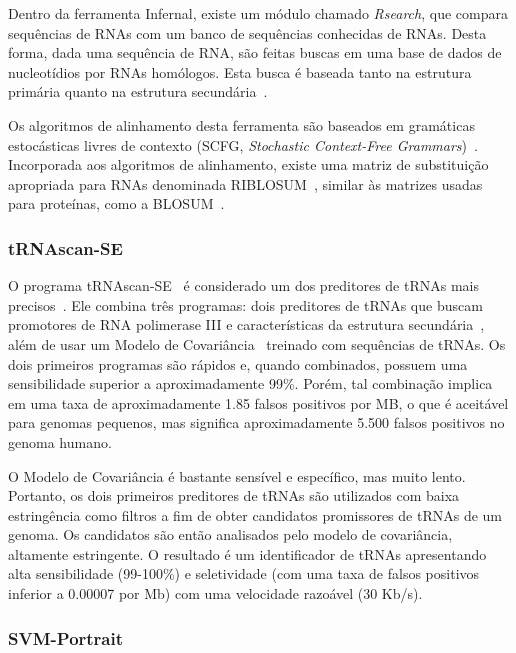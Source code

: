 Dentro da ferramenta Infernal, existe um módulo chamado \textit{Rsearch}, que compara
sequências de RNAs com um banco de sequências conhecidas de RNAs. Desta
forma, dada uma sequência de RNA, são feitas buscas em uma base de dados de
nucleotídios por RNAs homólogos. Esta busca é baseada tanto na estrutura primária quanto na estrutura secundária~\citep{klein2003rsearch:2003}.

Os algoritmos de alinhamento desta ferramenta são baseados em gramáticas estocásticas livres de contexto (SCFG, \textit{Stochastic Context-Free Grammars})~\citep{eddy1994rna:1994,sakakibara1994stochastic:1994}. Incorporada aos algoritmos de alinhamento, existe uma matriz de substituição apropriada para RNAs denominada RIBLOSUM~\citep{klein2003rsearch:2003}, similar às matrizes usadas para proteínas, como a BLOSUM~\citep{henikoff1992amino:1992}.


\subsubsection*{tRNAscan-SE}

O programa tRNAscan-SE~\citep{lowe1997trnascan:1997} é considerado um dos preditores de tRNAs mais precisos~\citep{laslett2004aragorn:2004}. Ele combina três programas: dois preditores de tRNAs que buscam promotores de RNA polimerase III e características da estrutura secundária~\citep{fichant1991identifying:1991,pavesi1994identification:1994}, além de usar um Modelo de Covariância~\citep{eddy1994rna:1994} treinado com sequências de tRNAs. Os dois primeiros programas são rápidos e, quando combinados, possuem uma sensibilidade superior a aproximadamente 99\%. Porém, tal combinação implica em uma taxa de aproximadamente 1.85 falsos positivos por MB, o que é aceitável para genomas pequenos, mas significa aproximadamente 5.500 falsos positivos no genoma humano.

O Modelo de Covariância é bastante sensível e específico, mas muito lento. Portanto, os dois primeiros preditores de tRNAs são utilizados com baixa estringência como filtros a fim de obter candidatos promissores de tRNAs de um genoma. Os candidatos são então analisados pelo modelo de covariância, altamente estringente. O resultado é um identificador de tRNAs apresentando alta sensibilidade (99-100\%) e seletividade (com uma taxa de falsos positivos inferior a 0.00007 por Mb) com uma velocidade razoável (30 Kb/s).


\subsubsection*{SVM-Portrait}

